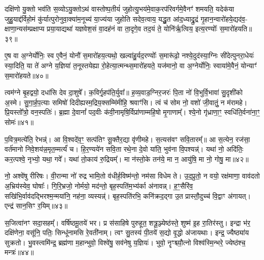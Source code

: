 दक्षि॑णो यु॒क्तो भव॑ति स॒व्यो\-ऽयु॒क्तो\-ऽथ॑ वास्तोष्प॒तीयं॑ जुहोत्यु॒भय॑मे॒वाक॒रप॑रिवर्गमे॒वैनꣳ॑ शमयति॒ यदेक॑या जुहु॒याद्द॑र्विहो॒मं कु॑र्यात्पुरोनुवा॒क्या॑म॒नूच्य॑ या॒ज्य॑या जुहोति सदेव॒त्वाय॒ यद्धु॒त आ॑द॒ध्याद्रु॒द्रं गृ॒हान॒न्वारो॑हये॒द्यद॑व॒- क्षाणा॒न्यस॑म्प्रक्षाप्य प्रया॒याद्यथा॑ यज्ञवेश॒सं वा॒दह॑नं वा ता॒दृगे॒व तद॒यं ते॒ योनि॑र्\mbox{}ऋ॒त्विय॒ इत्य॒रण्योः᳚ स॒मारो॑हयति॥३९॥

ए॒ष वा अ॒ग्नेर्योनिः॒ स्व ए॒वैनं॒ योनौ॑ स॒मारो॑हय॒त्यथो॒ खल्वा॑हु॒र्यद॒रण्योः᳚ स॒मारू॑ढो॒ नश्ये॒दुद॑स्या॒ग्निः सी॑देत्पुनरा॒धेयः॑ स्या॒दिति॒ या ते॑ अग्ने य॒ज्ञिया॑ त॒नूस्तयेह्या रो॒हेत्या॒त्मन्थ्स॒मारो॑हयते॒ यज॑मानो॒ वा अ॒ग्नेर्योनिः॒ स्वाया॑मे॒वैनं॒ योन्याꣳ॑ स॒मारो॑हयते॥४०॥

{}

त्वम॑ग्ने बृ॒हद्वयो॒ दधा॑सि देव दा॒शुषे᳚। क॒विर्गृ॒हप॑ति॒र्युवा᳚॥ ह॒व्य॒वाड॒ग्निर॒जरः॑ पि॒ता नो॑ वि॒भुर्वि॒भावा॑ सु॒दृशी॑को अ॒स्मे। सु॒गा॒र्\mbox{}ह॒प॒त्याः समिषो॑ दिदीह्यस्म॒द्रिय॒क्सम्मि॑मीहि॒ श्रवाꣳ॑सि। त्वं च॑ सोम नो॒ वशो॑ जी॒वातुं॒ न म॑रामहे। प्रि॒यस्तो᳚त्रो॒ वन॒स्पतिः॑। ब्र॒ह्मा दे॒वानां᳚ पद॒वीः क॑वी॒नामृषि॒र्विप्रा॑णाम्महि॒षो मृ॒गाणाम्᳚। श्ये॒नो गृ॑ध्राणा॒ꣳ॒ स्वधि॑ति॒र्वना॑ना॒ꣳ॒ सोमः॑॥४१॥

प॒वित्र॒मत्ये॑ति॒ रेभन्न्॑। आ वि॒श्वदे॑व॒ꣳ॒ सत्प॑तिꣳ सू॒क्तैर॒द्या वृ॑णीमहे। स॒त्यस॑वꣳ सवि॒तारम्᳚॥ आ स॒त्येन॒ रज॑सा॒ वर्त॑मानो निवे॒शय॑न्न॒मृत॒म्मर्त्यं॑ च। हि॒र॒ण्यये॑न सवि॒ता रथे॒ना दे॒वो या॑ति॒ भुव॑ना वि॒पश्यन्न्॑। यथा॑ नो॒ अदि॑तिः॒ कर॒त्पश्वे॒ नृभ्यो॒ यथा॒ गवे᳚। यथा॑ तो॒काय॑ रु॒द्रियम्᳚। मा न॑स्तो॒के तन॑ये॒ मा न॒ आयु॑षि॒ मा नो॒ गोषु॒ मा॥४२॥

नो॒ अश्वे॑षु रीरिषः। वी॒रान्मा नो॑ रुद्र भामि॒तो व॑धीर्\mbox{}ह॒विष्म॑न्तो॒ नम॑सा विधेम ते। उ॒द॒प्रुतो॒ न वयो॒ रक्ष॑माणा॒ वाव॑दतो अ॒भ्रिय॑स्येव॒ घोषाः᳚। गि॒रि॒भ्रजो॒ नोर्मयो॒ मद॑न्तो॒ बृह॒स्पति॑म॒भ्य॑र्का अ॑नावन्न्। ह॒ꣳ॒सैरि॑व॒ सखि॑भि॒र्वाव॑दद्भिरश्म॒न्मया॑नि॒ नह॑ना॒ व्यस्यन्न्॑। बृह॒स्पति॑रभि॒ कनि॑क्रद॒द्गा उ॒त प्रास्तौ॒दुच्च॑ वि॒द्वाꣳ अ॑गायत्। एन्द्र॑ सान॒सिꣳ र॒यिम्॥४३॥

स॒जित्वा॑नꣳ सदा॒सहम्᳚। वर्\mbox{}षि॑ष्ठमू॒तये॑ भर। प्र स॑साहिषे पुरुहूत॒ शत्रू॒ञ्ज्येष्ठ॑स्ते॒ शुष्म॑ इ॒ह रा॒तिर॑स्तु। इन्द्रा भ॑र॒ दक्षि॑णेना॒ वसू॑नि॒ पतिः॒ सिन्धू॑नामसि रे॒वती॑नाम्। त्वꣳ सु॒तस्य॑ पी॒तये॑ स॒द्यो वृ॒द्धो अ॑जायथाः। इन्द्र॒ ज्यैष्ठ्या॑य सुक्रतो। भु॒वस्त्वमि॑न्द्र॒ ब्रह्म॑णा म॒हान्भुवो॒ विश्वे॑षु॒ सव॑नेषु य॒ज्ञियः॑। भुवो॒ नॄꣳश्च्यौ॒त्नो विश्व॑स्मि॒न्भरे॒ ज्येष्ठ॑श्च॒ मन्त्रः॑॥४४॥


